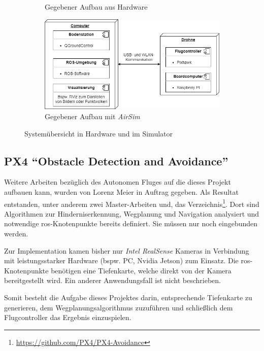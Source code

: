 \begin{figure}
\begin{subfigure}{0.5\linewidth}
        \caption{Gegebener Aufbau aus Hardware}
        \label{fig:sim2}
        \end{subfigure}
    \hfill
    \begin{subfigure}{0.7\linewidth}
        \includegraphics[width=\linewidth]{images/setup_simulator-Page-3.drawio.png}
        \caption{Gegebener Aufbau mit \textit{AirSim}}
        \label{fig:sim3}
        \end{subfigure}
         
    \caption{Systemübersicht in Hardware und im Simulator}
    \label{fig:simulator_aufbauten}
    \end{figure}

\subsection{PX4 \enquote{Obstacle Detection and Avoidance}}
Weitere Arbeiten bezüglich des Autonomen Fluges auf die dieses Projekt aufbauen kann, wurden von Lorenz Meier in Auftrag gegeben. Als Resultat entstanden, unter anderem zwei Master-Arbeiten und, das Verzeichnis\footnote{\url{https://github.com/PX4/PX4-Avoidance}\cite{dronecodestiftungObstacleDetectionAvoidance2023}}. Dort sind Algorithmen zur Hinderniserkennung, Wegplanung und Navigation analysiert und notwendige \acrshort{ros}-Knotenpunkte bereits definiert. Sie müssen nur noch eingebunden werden.

Zur Implementation kamen bisher nur \textit{Intel RealSense} Kameras in Verbindung mit leistungsstarker Hardware (bspw. PC, Nvidia Jetson) zum Einsatz. Die \acrshort{ros}-Knotenpunkte benötigen eine Tiefenkarte, welche direkt von der Kamera bereitgestellt wird. Ein anderer Anwendungsfall ist nicht beschrieben.

Somit besteht die Aufgabe dieses Projektes darin, entsprechende Tiefenkarte zu generieren, dem Wegplanungsalgorithmus zuzuführen und schließlich dem Flugcontroller das Ergebnis einzuspielen.

